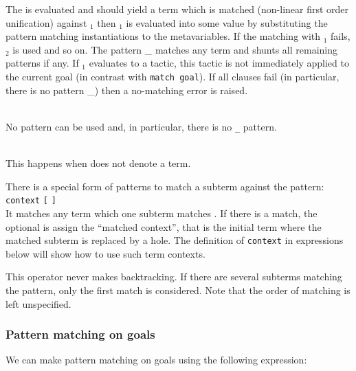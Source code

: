 The {\tacexpr} is evaluated and should yield a term which is matched
(non-linear first order unification) against {\cpattern}$_1$ then
{\tacexpr}$_1$ is evaluated into some value by substituting the
pattern matching instantiations to the metavariables. If the matching
with {\cpattern}$_1$ fails, {\cpattern}$_2$ is used and so on.  The
pattern {\_} matches any term and shunts all remaining patterns if
any. If {\tacexpr}$_1$ evaluates to a tactic, this tactic is not
immediately applied to the current goal (in contrast with {\tt match
goal}). If all clauses fail (in particular, there is no pattern {\_})
then a no-matching error is raised. \\

\begin{ErrMsgs}
\item {}\\
No pattern can be used and, in particular, there is no {\tt \_} pattern.
\item {}\\
This happens when {\tacexpr} does not denote a term.
\end{ErrMsgs}

There is a special form of patterns to match a subterm against the
pattern:\\

{\tt context} {\ident} {\tt [} {\cpattern} {\tt ]}\\

It matches any term which one subterm matches {\cpattern}. If there is
a match, the optional {\ident} is assign the ``matched context'', that
is the initial term where the matched subterm is replaced by a
hole. The definition of {\tt context} in expressions below will show
how to use such term contexts.

This operator never makes backtracking. If there are several subterms
matching the pattern, only the first match is considered. Note that
the order of matching is left unspecified.


\subsubsection{Pattern matching on goals}

We can make pattern matching on goals using the following expression:

